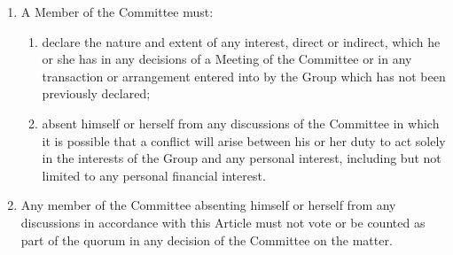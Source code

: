 \documentclass[12pt]{constitution}
\begin{document}


\begin{enumerate}
    \item A Member of the Committee must:
    \begin{enumerate}
        \item declare the nature and extent of any interest, direct or indirect, which he or she has in any decisions of a Meeting of the Committee or in any transaction or arrangement entered into by the Group which has not been previously declared;
        \item absent himself or herself from any discussions of the Committee in which it is possible that a conflict will arise between his or her duty to act solely in the interests of the Group and any personal interest, including but not limited to any personal financial interest.
    \end{enumerate}

\item Any member of the Committee absenting himself or herself from any discussions in accordance with this Article must not vote or be counted as part of the quorum in any decision of the Committee on the matter.
\end{enumerate}


\end{document}
